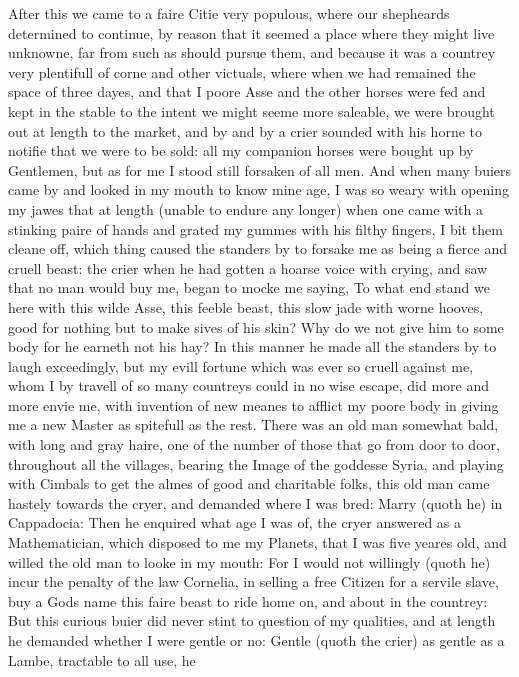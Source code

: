 After this we came to a faire Citie very populous, where our shepheards
determined to continue, by reason that it seemed a place where they might live
unknowne, far from such as should pursue them, and because it was a countrey
very plentifull of corne and other victuals, where when we had remained the
space of three dayes, and that I poore Asse and the other horses were fed and
kept in the stable to the intent we might seeme more saleable, we were brought
out at length to the market, and by and by a crier sounded with his horne to
notifie that we were to be sold: all my companion horses were bought up by
Gentlemen, but as for me I stood still forsaken of all men. And when many
buiers came by and looked in my mouth to know mine age, I was so weary with
opening my jawes that at length (unable to endure any longer) when one came
with a stinking paire of hands and grated my gummes with his filthy fingers, I
bit them cleane off, which thing caused the standers by to forsake me as being
a fierce and cruell beast: the crier when he had gotten a hoarse voice with
crying, and saw that no man would buy me, began to mocke me saying, To what end
stand we here with this wilde Asse, this feeble beast, this slow jade with
worne hooves, good for nothing but to make sives of his skin? Why do we not
give him to some body for he earneth not his hay? In this manner he made all
the standers by to laugh exceedingly, but my evill fortune which was ever so
cruell against me, whom I by travell of so many countreys could in no wise
escape, did more and more envie me, with invention of new meanes to afflict my
poore body in giving me a new Master as spitefull as the rest. There was an old
man somewhat bald, with long and gray haire, one of the number of those that go
from door to door, throughout all the villages, bearing the Image of the
goddesse Syria, and playing with Cimbals to get the almes of good and
charitable folks, this old man came hastely towards the cryer, and demanded
where I was bred: Marry (quoth he) in Cappadocia: Then he enquired what age I
was of, the cryer answered as a Mathematician, which disposed to me my Planets,
that I was five yeares old, and willed the old man to looke in my mouth: For I
would not willingly (quoth he) incur the penalty of the law Cornelia, in
selling a free Citizen for a servile slave, buy a Gods name this faire beast to
ride home on, and about in the countrey: But this curious buier did never stint
to question of my qualities, and at length he demanded whether I were gentle or
no: Gentle (quoth the crier) as gentle as a Lambe, tractable to all use, he
